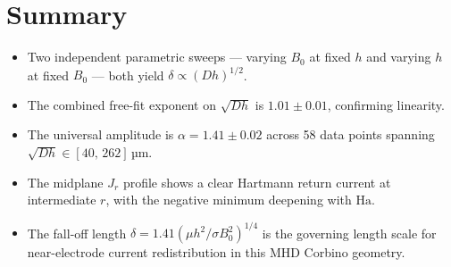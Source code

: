 \documentclass[11pt, a4paper]{article}
\begin{document}
\section{Summary}

\begin{itemize}
    \item Two independent parametric sweeps — varying $B_0$ at fixed $h$ and
          varying $h$ at fixed $B_0$ — both yield $\delta\propto (D h)^{1/2}$.
    \item The combined free-fit exponent on $\sqrt{Dh}$ is $1.01\pm0.01$,
          confirming linearity.
    \item The universal amplitude is $\alpha = 1.41\pm0.02$ across 58 data points
          spanning $\sqrt{Dh}\in[40,\,262]$\,µm.
    \item The midplane $J_r$ profile shows a clear Hartmann return current at
          intermediate $r$, with the negative minimum deepening with $\mathrm{Ha}$.
    \item The fall-off length $\delta = 1.41({\mu h^2}/{\sigma B_0^2})^{1/4}$
          is the governing length scale for near-electrode current redistribution
          in this MHD Corbino geometry.
\end{itemize}
\end{document}
